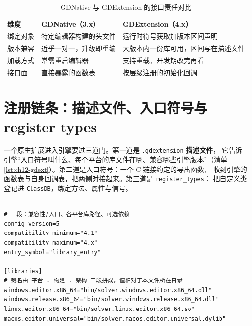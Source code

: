 \documentclass[12pt,a4paper,fontset=fandol]{ctexbook}
\newcommand{\Tp}[1]{\texttt{#1}}
\newcommand{\Lang}[1]{\textsf{#1}}
\newcommand{\CL}{\Lang{C}}
\begin{document}
\begin{table}[htbp]
\centering
\caption{GDNative 与 GDExtension 的接口责任对比}
\label{tab:ch12-abigen}
\begin{tabular}{>{\raggedright\arraybackslash}p{} >{\raggedright\arraybackslash}p{} >{\raggedright\arraybackslash}p{}}
\toprule
\textbf{维度} & \textbf{GDNative（3.x）} & \textbf{GDExtension（4.x）} \\
\midrule
绑定对象 & 特定编辑器构建的头文件 & 运行时符号获取加版本区间声明 \\
版本兼容 & 近乎一对一，升级即重编 & 大版本内一份库可用，区间写在描述文件 \\
加载方式 & 常需重启编辑器 & 支持重载，开发期改完再看 \\
接口面 & 直接暴露的函数表 & 按层级注册的初始化回调 \\
\bottomrule
\end{tabular}
\end{table}

\section{注册链条：描述文件、入口符号与 register types}
\label{sec:ch12-registration}

一个原生扩展进入引擎要过三道门。第一道是 \Tp{.gdextension} \textbf{描述文件}，
它告诉引擎``入口符号叫什么、每个平台的库文件在哪、兼容哪些引擎版本''（清单
\ref{lst:ch12-gdext}）。第二道是入口符号：一个 \CL{} 链接约定的导出函数，
收到引擎的函数表与自身回调表，把两侧对接起来。第三道是 \Tp{register\_types}：
把自定义类登记进 \Tp{ClassDB}，绑定方法、属性与信号。

\begin{lstlisting}[style=yamlstyle, caption={particle solver.gdextension 的描述形状（键名以官方模板生成的为准）}, label={lst:ch12-gdext}, framexleftmargin=12pt, framexrightmargin=12pt]

# 三段：兼容性/入口、各平台库路径、可选依赖
config_version=5
compatibility_minimum="4.1"
compatibility_maximum="4.x"
entry_symbol="library_entry"

[libraries]
# 键名由 平台 . 构建 . 架构 三段拼成，值相对于本文件所在目录
windows.editor.x86_64="bin/solver.windows.editor.x86_64.dll"
windows.release.x86_64="bin/solver.windows.release.x86_64.dll"
linux.editor.x86_64="bin/solver.linux.editor.x86_64.so"
macos.editor.universal="bin/solver.macos.editor.universal.dylib"
\end{lstlisting}
\end{document}
